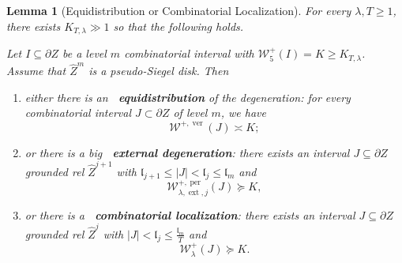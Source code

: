 \documentclass{amsart}
\newcommand{\1}{{\mathbb 1 }}
\newcommand{\ext}{{\operatorname{ext}}}
\newcommand{\Width}{{\mathcal W}}
\newcommand{\wZ}{{\widehat Z}}
\newcommand{\length}{{\mathfrak l}}
\newcommand\ver{{\operatorname{ver}}}
\newcommand\per{{\operatorname{per}}}
\newtheorem{lem}[thm]{Lemma}
\theoremstyle{remark}
\numberwithin{equation}{section}
\theoremstyle{definition}
\begin{document}
\begin{lem}[Equidistribution or Combinatorial Localization]\label{lem:replication}
    For every $\lambda, T \geq 1$, there exists $K_{T, \lambda} \gg 1$ so that the following holds.

    Let $I \subseteq \partial Z$ be a level $m$ combinatorial interval with $\Width^{+}_5(I) = K \geq K_{T, \lambda}$. Assume that $\wZ^m$ is a pseudo-Siegel disk. Then 
    \begin{enumerate}[label=\text{(\roman*)},font=\normalfont,leftmargin=*]
        \item\label{item:repli:1} either there is an {\bf~equidistribution} of the degeneration: for every combinatorial  interval $J \subset \partial Z$ of level $m$, we have
        $$
        \Width^{+, \ver}(J) \asymp K;
        $$
        \item\label{item:repli:2} or there is a big {\bf~external degeneration}: there exists an interval $J \subseteq \partial Z$ grounded rel $\wZ^{j+1}$ with $\length_{j+1} \le |J| < \length_j\le \length_{m}$ and
        $$
        \Width^{+,\per}_{\lambda, \ext, j}(J) \succeq K,  
        $$
        \item\label{item:repli:3} or there is a {\bf~combinatorial localization}: there exists an interval $J \subseteq \partial Z$ grounded rel $\wZ^j$ with $|J| < \length_j \leq \frac{\length_m}{T}$ and 
        $$
        \Width^+_\lambda(J) \succeq K.
        $$
    \end{enumerate}
\end{lem}
\end{document}
